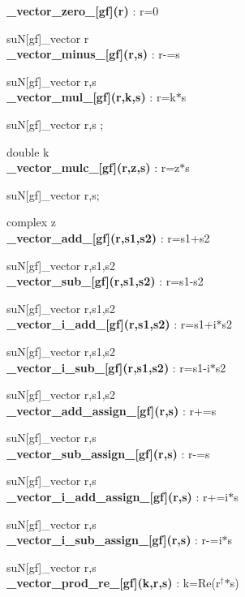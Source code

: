 \documentclass[10pt]{article}
\begin{document}
\noindent\textbf{\_vector\_zero\_[gf](r) } : r=0 

suN[gf]\_vector r \\


\noindent\textbf{\_vector\_minus\_[gf](r,s) } : r-=s

suN[gf]\_vector r,s \\


\noindent\textbf{\_vector\_mul\_[gf](r,k,s) } : r=k$*$s 

suN[gf]\_vector r,s ; 

double k\\


\noindent\textbf{\_vector\_mulc\_[gf](r,z,s) } : r=z$*$s 

suN[gf]\_vector r,s; 

complex z\\


\noindent\textbf{\_vector\_add\_[gf](r,s1,s2) } : r=s1+s2 

suN[gf]\_vector r,s1,s2\\


\noindent\textbf{\_vector\_sub\_[gf](r,s1,s2) } : r=s1-s2 

suN[gf]\_vector r,s1,s2\\


\noindent\textbf{\_vector\_i\_add\_[gf](r,s1,s2) } : r=s1+i$*$s2 

suN[gf]\_vector r,s1,s2\\


\noindent\textbf{\_vector\_i\_sub\_[gf](r,s1,s2) } : r=s1-i$*$s2 

suN[gf]\_vector r,s1,s2\\


\noindent\textbf{\_vector\_add\_assign\_[gf](r,s) } : r+=s 

suN[gf]\_vector r,s\\


\noindent\textbf{\_vector\_sub\_assign\_[gf](r,s) } : r-=s 

suN[gf]\_vector r,s\\


\noindent\textbf{\_vector\_i\_add\_assign\_[gf](r,s) } : r+=i$*$s 

suN[gf]\_vector r,s\\


\noindent\textbf{\_vector\_i\_sub\_assign\_[gf](r,s) } : r-=i$*$s 

suN[gf]\_vector r,s\\


\noindent\textbf{\_vector\_prod\_re\_[gf](k,r,s) } : k=Re(r$^\dagger$$*$s) 
\end{document}
